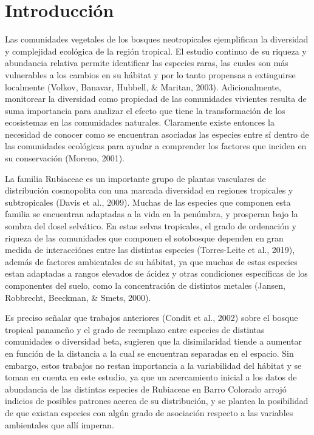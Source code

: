 \documentclass[11pt,]{article}
\begin{document}
\vskip 6.5pt


\noindent  \section{Introducción}\label{introducciuxf3n}

Las comunidades vegetales de los bosques neotropicales ejemplifican la
diversidad y complejidad ecológica de la región tropical. El estudio
continuo de su riqueza y abundancia relativa permite identificar las
especies raras, las cuales son más vulnerables a los cambios en su
hábitat y por lo tanto propensas a extinguirse localmente (Volkov,
Banavar, Hubbell, \& Maritan, 2003). Adicionalmente, monitorear la
diversidad como propiedad de las comunidades vivientes resulta de suma
importancia para analizar el efecto que tiene la transformación de los
ecosistemas en las comunidades naturales. Claramente existe entonces la
necesidad de conocer como se encuentran asociadas las especies entre sí
dentro de las comunidades ecológicas para ayudar a comprender los
factores que inciden en su conservación (Moreno, 2001).

La familia Rubiaceae es un importante grupo de plantas vasculares de
distribución cosmopolita con una marcada diversidad en regiones
tropicales y subtropicales (Davis et al., 2009). Muchas de las especies
que componen esta familia se encuentran adaptadas a la vida en la
penúmbra, y prosperan bajo la sombra del dosel selvático. En estas
selvas tropicales, el grado de ordenación y riqueza de las comunidades
que componen el sotobosque dependen en gran medida de interacciónes
entre las distintas especies (Torres-Leite et al., 2019), además de
factores ambientales de su hábitat, ya que muchas de estas especies
estan adaptadas a rangos elevados de ácidez y otras condiciones
específicas de los componentes del suelo, como la concentración de
distintos metales (Jansen, Robbrecht, Beeckman, \& Smets, 2000).

Es preciso señalar que trabajos anteriores (Condit et al., 2002) sobre
el bosque tropical panameño y el grado de reemplazo entre especies de
distintas comunidades o diversidad beta, sugieren que la disimilaridad
tiende a aumentar en función de la distancia a la cual se encuentran
separadas en el espacio. Sin embargo, estos trabajos no restan
importancia a la variabilidad del hábitat y se toman en cuenta en este
estudio, ya que un acercamiento inicial a los datos de abundancia de las
distintas especies de Rubiaceae en Barro Colorado arrojó indicios de
posibles patrones acerca de su distribución, y se plantea la posibilidad
de que existan especies con algún grado de asociación respecto a las
variables ambientales que allí imperan.
\end{document}
